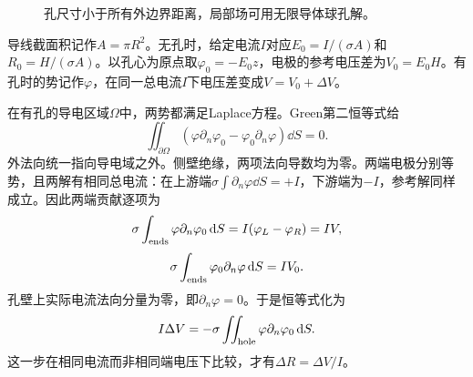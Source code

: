 \begin{figure}[H]\centering
{}
\caption{孔尺寸小于所有外边界距离，局部场可用无限导体球孔解。}\label{fig:es3-e12-q}
\end{figure}
\begin{solution}
导线截面积记作$A=\pi R^2$。无孔时，给定电流$I$对应$E_0=I/(\sigma A)$和$R_0=H/(\sigma A)$。以孔心为原点取$\varphi_0=-E_0z$，电极的参考电压差为$V_0=E_0H$。有孔时的势记作$\varphi$，在同一总电流$I$下电压差变成$V=V_0+\Delta V$。

在有孔的导电区域$\Omega$中，两势都满足Laplace方程。Green第二恒等式给
\[\iint_{\partial\Omega}(\varphi\partial_n\varphi_0-
\varphi_0\partial_n\varphi)\dd S=0.
\]
外法向统一指向导电域之外。侧壁绝缘，两项法向导数均为零。两端电极分别等势，且两解有相同总电流：在上游端$\sigma\int\partial_n\varphi\dd S=+I$，下游端为$-I$，参考解同样成立。因此两端贡献逐项为
\[\sigma\int_{\rm ends}\varphi\partial_n\varphi_0\mathop{}\!\mathrm d S=I(\varphi_L-\varphi_R)=IV,
\]
\[\sigma\int_{\rm ends}\varphi_0\partial_n\varphi\mathop{}\!\mathrm d S=IV_0.
\]
孔壁上实际电流法向分量为零，即$\partial_n\varphi=0$。于是恒等式化为
\[I\Delta V=-\sigma\iint_{\rm hole}\varphi\partial_n\varphi_0\mathop{}\!\mathrm d S.
\]
这一步在相同电流而非相同端电压下比较，才有$\Delta R=\Delta V/I$。


\end{solution}
